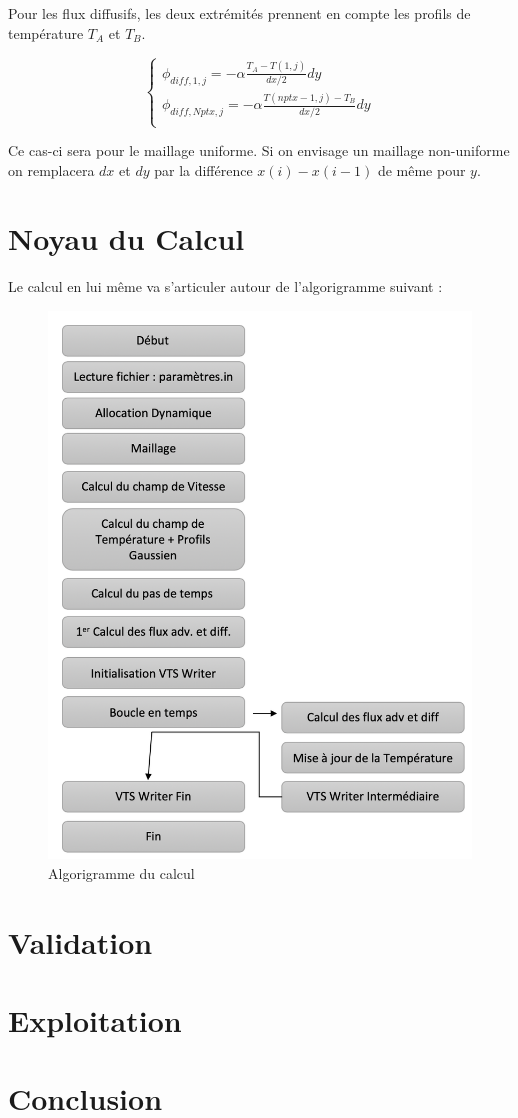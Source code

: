 \documentclass[a4paper,oneside]{article}
\makeatletter
\def\bigcenter{\trivlist \bigcentering\item\relax}
\def\bigcentering{\let\\\@centercr\rightskip\@bigflushglue%
\leftskip\@bigflushglue
\parindent\z@\parfillskip\z@skip}
\makeatother
\begin{document}
Pour les flux diffusifs, les deux extrémités prennent en compte les profils de température $T_A$ et $T_B$.

\begin{equation*}
	\begin{cases}
		\phi_{diff,1,j} = -\alpha\frac{T_A - T(1,j)}{dx/2} dy\\
		\phi_{diff,Nptx,j} = -\alpha\frac{T(nptx-1,j) -T_B }{dx/2} dy\\
	\end{cases}
\end{equation*}
 
Ce cas-ci sera pour le maillage uniforme.
Si on envisage un maillage non-uniforme on remplacera $dx$ et $dy$ par la différence $x(i)-x(i-1)$ de même pour $y$.

\section{Noyau du Calcul}

Le calcul en lui même va s'articuler autour de l'algorigramme suivant :

\begin{figure}[h!]
\bigcenter
\includegraphics[scale=0.4]{Algo.PNG}
\caption{Algorigramme du calcul}
\end{figure}





\section{Validation}


\section{Exploitation}


\section{Conclusion}
\end{document}
